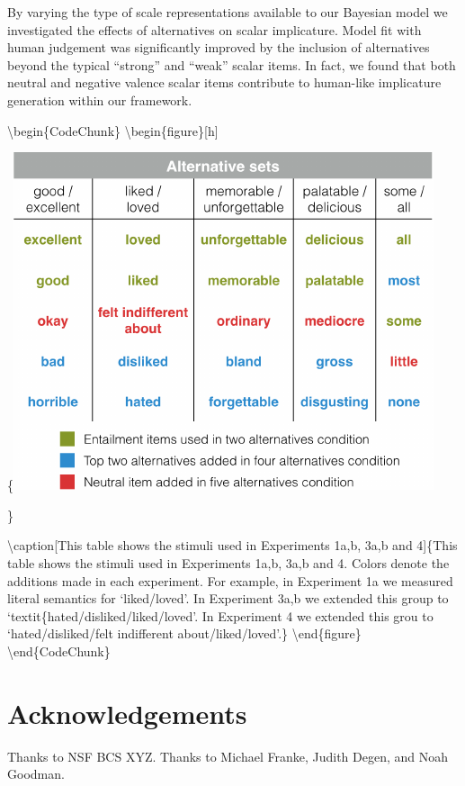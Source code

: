 \documentclass[10pt, letterpaper]{article}
\begin{document}
By varying the type of scale representations available to our Bayesian
model we investigated the effects of alternatives on scalar implicature.
Model fit with human judgement was significantly improved by the
inclusion of alternatives beyond the typical ``strong'' and ``weak''
scalar items. In fact, we found that both neutral and negative valence
scalar items contribute to human-like implicature generation within our
framework.

\textbackslash{}begin\{CodeChunk\}
\textbackslash{}begin\{figure\}{[}h{]}

\{\centering \includegraphics{figs/allScalesTable-1}

\}

\textbackslash{}caption{[}This table shows the stimuli used in
Experiments 1a,b, 3a,b and 4{]}\{This table shows the stimuli used in
Experiments 1a,b, 3a,b and 4. Colors denote the additions made in each
experiment. For example, in Experiment 1a we measured literal semantics
for `liked/loved'. In Experiment 3a,b we extended this group to
`textit\{hated/disliked/liked/loved'. In Experiment 4 we extended this
grou to `hated/disliked/felt indifferent
about/liked/loved'.\}\label{fig:allScalesTable}
\textbackslash{}end\{figure\} \textbackslash{}end\{CodeChunk\}

\section{Acknowledgements}\label{acknowledgements}

Thanks to NSF BCS XYZ. Thanks to Michael Franke, Judith Degen, and Noah
Goodman.
\end{document}
